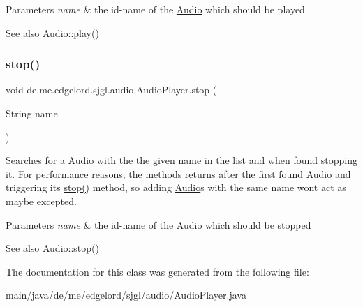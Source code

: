 \begin{DoxyParams}{Parameters}
{\em name} & the id-\/name of the {\ttfamily \mbox{\hyperlink{classde_1_1me_1_1edgelord_1_1sjgl_1_1audio_1_1_audio}{Audio}}} which should be played\\
\hline
\end{DoxyParams}
\begin{DoxySeeAlso}{See also}
\mbox{\hyperlink{classde_1_1me_1_1edgelord_1_1sjgl_1_1audio_1_1_audio_ac87651401394ee2e141c099a175cd7cb}{Audio\+::play()}} 
\end{DoxySeeAlso}
\mbox{\label{classde_1_1me_1_1edgelord_1_1sjgl_1_1audio_1_1_audio_player_a52bd650d815c823dc0a5e99b4aeba927}} 
\subsubsection{\texorpdfstring{stop()}{stop()}}
{\footnotesize\ttfamily void de.\+me.\+edgelord.\+sjgl.\+audio.\+Audio\+Player.\+stop (\begin{DoxyParamCaption}\item[{String}]{name }\end{DoxyParamCaption})}

Searches for a {\ttfamily \mbox{\hyperlink{classde_1_1me_1_1edgelord_1_1sjgl_1_1audio_1_1_audio}{Audio}}} with the the given name in the list and when found stopping it. For performance reasons, the methods returns after the first found {\ttfamily \mbox{\hyperlink{classde_1_1me_1_1edgelord_1_1sjgl_1_1audio_1_1_audio}{Audio}}} and triggering its {\ttfamily \mbox{\hyperlink{classde_1_1me_1_1edgelord_1_1sjgl_1_1audio_1_1_audio_player_a52bd650d815c823dc0a5e99b4aeba927}{stop()}}} method, so adding {\ttfamily \mbox{\hyperlink{classde_1_1me_1_1edgelord_1_1sjgl_1_1audio_1_1_audio}{Audio}}}s with the same name won\textquotesingle{}t act as maybe excepted.


\begin{DoxyParams}{Parameters}
{\em name} & the id-\/name of the {\ttfamily \mbox{\hyperlink{classde_1_1me_1_1edgelord_1_1sjgl_1_1audio_1_1_audio}{Audio}}} which should be stopped\\
\hline
\end{DoxyParams}
\begin{DoxySeeAlso}{See also}
\mbox{\hyperlink{classde_1_1me_1_1edgelord_1_1sjgl_1_1audio_1_1_audio_a2e9d9c2e43c4bab399c7f360c8f90ce2}{Audio\+::stop()}} 
\end{DoxySeeAlso}


The documentation for this class was generated from the following file\+:\begin{DoxyCompactItemize}
\item 
main/java/de/me/edgelord/sjgl/audio/Audio\+Player.\+java\end{DoxyCompactItemize}
